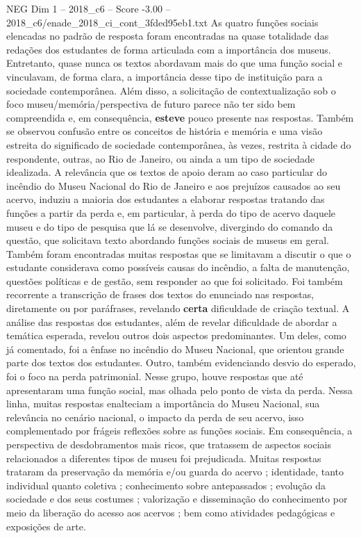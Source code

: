 \begin{textsample}{NEG Dim 1 – 2018\_c6 – Score -3.00 – 2018\_c6/enade\_2018\_ci\_cont\_3fded95eb1.txt}
As quatro funções sociais elencadas no padrão de resposta foram encontradas na quase totalidade das redações dos estudantes de forma articulada com a importância dos museus.
Entretanto, quase nunca os textos abordavam mais do que uma função social e vinculavam, de forma clara, a importância desse tipo de instituição para a sociedade contemporânea.
Além disso, a solicitação de contextualização sob o foco museu/memória/perspectiva de futuro parece não ter sido bem compreendida e, em consequência, \textbf{esteve} pouco presente nas respostas.
Também se observou confusão entre os conceitos de história e memória e uma visão estreita do significado de sociedade contemporânea, às vezes, restrita à cidade do respondente, outras, ao Rio de Janeiro, ou ainda a um tipo de sociedade idealizada.
A relevância que os textos de apoio deram ao caso particular do incêndio do Museu Nacional do Rio de Janeiro e aos prejuízos causados ao seu acervo, induziu a maioria dos estudantes a elaborar respostas tratando das funções a partir da perda e, em particular, à perda do tipo de acervo daquele museu e do tipo de pesquisa que lá se desenvolve, divergindo do comando da questão, que solicitava texto abordando funções sociais de museus em geral.
Também foram encontradas muitas respostas que se limitavam a discutir o que o estudante considerava como possíveis causas do incêndio, a falta de manutenção, questões políticas e de gestão, sem responder ao que foi solicitado.
Foi também recorrente a transcrição de frases dos textos do enunciado nas respostas, diretamente ou por paráfrases, revelando \textbf{certa} dificuldade de criação textual.
A análise das respostas dos estudantes, além de revelar dificuldade de abordar a temática esperada, revelou outros dois aspectos predominantes.
Um deles, como já comentado, foi a ênfase no incêndio do Museu Nacional, que orientou grande parte dos textos dos estudantes.
Outro, também evidenciando desvio do esperado, foi o foco na perda patrimonial.
Nesse grupo, houve respostas que até apresentaram uma função social, mas olhada pelo ponto de vista da perda.
Nessa linha, muitas respostas enalteciam a importância do Museu Nacional, sua relevância no cenário nacional, o impacto da perda de seu acervo, isso complementado por frágeis reflexões sobre as funções sociais.
Em consequência, a perspectiva de desdobramentos mais ricos, que tratassem de aspectos sociais relacionados a diferentes tipos de museu foi prejudicada.
Muitas respostas trataram da preservação da memória e/ou guarda do acervo ; identidade, tanto individual quanto coletiva ; conhecimento sobre antepassados ; evolução da sociedade e dos seus costumes ; valorização e disseminação do conhecimento por meio da liberação do acesso aos acervos ; bem como atividades pedagógicas e exposições de arte.

\end{textsample}
